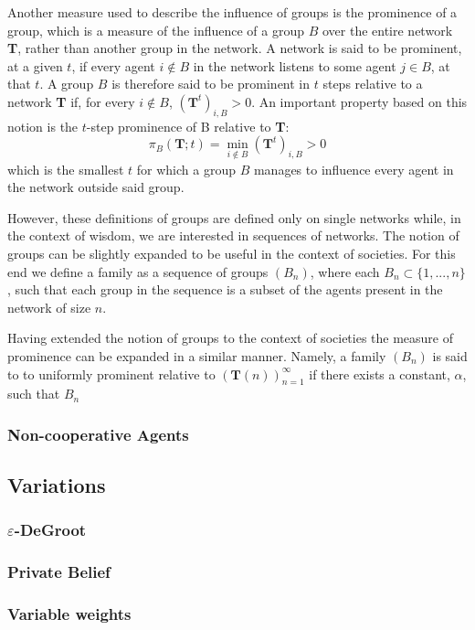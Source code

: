 \documentclass{article}
\newcommand{\T}{\textbf{T}}
\newcommand{\Soc}{(\T(n))^{\infty}_{n=1}}
\begin{document}
Another measure used to describe the influence of groups is the prominence of a group, which is a measure of the influence of a group $B$ over the entire network \textbf{T}, rather than another group in the network.
 A network is said to be prominent, at a given $t$, if every agent $i \notin B$ in the network listens to some agent $j\in B$, at that $t$.
A group $B$ is therefore said to be prominent in $t$ steps relative to a network \textbf{T} if, for every $i \notin B$, $(\textbf{T}^{t})_{i,B} > 0$. An important property based on this notion is the $t$-step prominence of B relative to \textbf{T}: 
\begin{equation}
    \pi_B(\textbf{T}; t) = \min_{i\notin B} (\textbf{T}^{t})_{i,B} > 0
\end{equation}
which is the smallest $t$ for which a group $B$ manages to influence every agent in the network outside said group.\newline

However, these definitions of groups are defined only on single networks while, in the context of wisdom, we are interested in sequences of networks. The notion of groups can be slightly expanded to be useful in the context of societies. For this end we define a family as a sequence of groups $(B_n)$, where each $B_n \subset \{1, ..., n\}$, such that each group in the sequence is a subset of the agents present in the network of size $n$.

Having extended the notion of groups to the context of societies the measure of prominence can be expanded in a similar manner. Namely, a family $(B_n)$ is said to to uniformly prominent relative to $\Soc$ if there exists a constant, $\alpha$, such that $B_n$
\subsubsection{Non-cooperative Agents}

\subsection{Variations}
\subsubsection{$\varepsilon$-DeGroot}
\subsubsection{Private Belief}
\subsubsection{Variable weights}

\newpage





\end{document}
